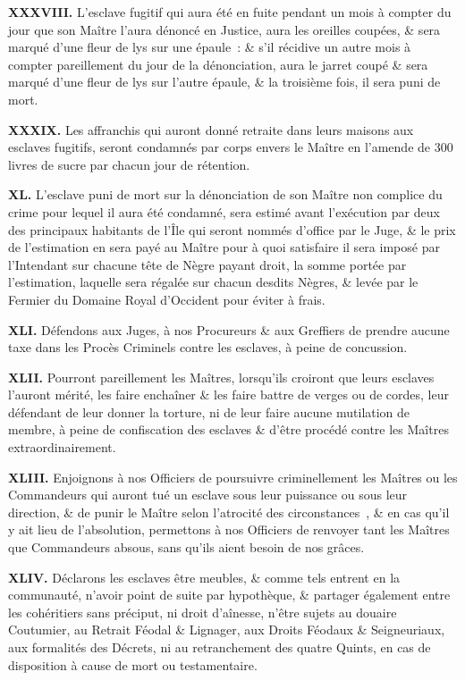 \documentclass[twoside]{book} %
\newcommand{\labelchar}[1]{\textbf{\color{rubric} #1}}
\begin{document}
\labelchar{XXXVIII.} L’esclave fugitif qui aura été en fuite pendant un mois à compter du jour que son Maître l’aura dénoncé en Justice, aura les oreilles coupées, \& sera marqué d’une fleur de lys sur une épaule : \& s’il récidive un autre mois à compter pareillement du jour de la dénonciation, aura le jarret coupé \& sera marqué d’une fleur de lys sur l’autre épaule, \& la troisième fois, il sera puni de mort.\par
\labelchar{XXXIX.} Les affranchis qui auront donné retraite dans leurs maisons aux esclaves fugitifs, seront condamnés par corps envers le Maître en l’amende de 300 livres de sucre par chacun jour de rétention.\par
\labelchar{XL.} L’esclave puni de mort sur la dénonciation de son Maître non complice du crime pour lequel il aura été condamné, sera estimé avant l’exécution par deux des principaux habitants de l’Île qui seront nommés d’office par le Juge, \& le prix de l’estimation en sera payé au Maître pour à quoi satisfaire il sera imposé par l’Intendant sur chacune tête de Nègre payant droit, la somme portée par l’estimation, laquelle sera régalée sur chacun desdits Nègres, \& levée par le Fermier du Domaine Royal d’Occident pour éviter à frais.\par
\labelchar{XLI.} Défendons aux Juges, à nos Procureurs \& aux Greffiers de prendre aucune taxe dans les Procès Criminels contre les esclaves, à peine de concussion.\par
\labelchar{XLII.} Pourront pareillement les Maîtres, lorsqu’ils croiront que leurs esclaves l’auront mérité, les faire enchaîner \& les faire battre de verges ou de cordes, leur défendant de leur donner la torture, ni de leur faire aucune mutilation de membre, à peine de confiscation des esclaves \& d’être procédé contre les Maîtres extraordinairement.\par
\labelchar{XLIII.} Enjoignons à nos Officiers de poursuivre criminellement les Maîtres ou les Commandeurs qui auront tué un esclave sous leur puissance ou sous leur direction, \& de punir le Maître selon l’atrocité des circonstances , \& en cas qu’il y ait lieu de l’absolution, permettons à nos Officiers de renvoyer tant les Maîtres que Commandeurs absous, sans qu’ils aient besoin de nos grâces.\par
\labelchar{XLIV.} Déclarons les esclaves être meubles, \& comme tels entrent en la communauté, n’avoir point de suite par hypothèque, \& partager également entre les cohéritiers sans préciput, ni droit d’aînesse, n’être sujets au douaire Coutumier, au Retrait Féodal \& Lignager, aux Droits Féodaux \& Seigneuriaux, aux formalités des Décrets, ni au retranchement des quatre Quints, en cas de disposition à cause de mort ou testamentaire.\par
\end{document}
